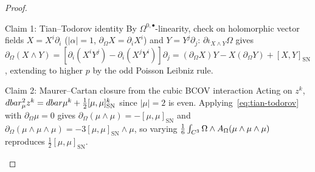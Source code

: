 \begin{proof}\leavevmode
\begin{proofpart}{Claim 1: Tian--Todorov identity}
By $\Omega^{0,\bullet}$-linearity, check on holomorphic vector fields $X = X^i\partial_i$ ($|\alpha|=1$, $\partial_\Omega X = \partial_i X^i$) and $Y = Y^j\partial_j$: $\partial\iota_{X\wedge Y}\Omega$ gives $\partial_\Omega(X\wedge Y) = [\partial_i(X^i Y^j) - \partial_i(X^j Y^i)]\partial_j = (\partial_\Omega X)Y - X(\partial_\Omega Y) + [X,Y]_{\mathrm{SN}}$, extending to higher $p$ by the odd Poisson Leibniz rule.
\end{proofpart}
\begin{proofpart}{Claim 2: Maurer--Cartan closure from the cubic BCOV interaction}
Acting on $z^k$, $dbar_\mu^2 z^k = dbar\mu^k + \frac{1}{2}[\mu,\mu]_{\mathrm{SN}}^k$ since $|\mu| = 2$ is even. Applying~\eqref{eq:tian-todorov} with $\partial_\Omega\mu = 0$ gives $\partial_\Omega(\mu\wedge\mu) = -[\mu,\mu]_{\mathrm{SN}}$ and $\partial_\Omega(\mu\wedge\mu\wedge\mu) = -3[\mu,\mu]_{\mathrm{SN}}\wedge\mu$, so varying $\frac{1}{6}\int_{C^3}\Omega\wedge A_\Omega(\mu\wedge\mu\wedge\mu)$ reproduces $\frac{1}{2}[\mu,\mu]_{\mathrm{SN}}$.
\end{proofpart}
\end{proof}

